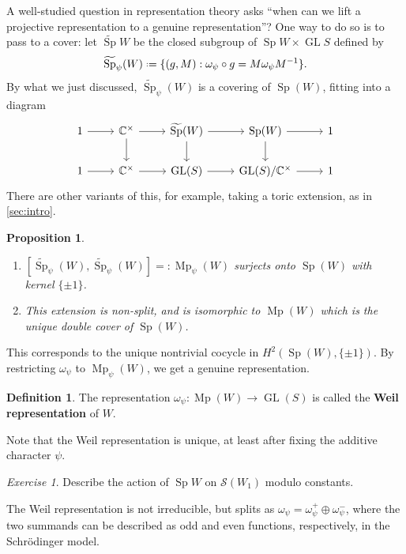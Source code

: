 \documentclass[11pt,a4paper,leqno]{article}
\let\mc\mathcal
\newcommand{\1}{\mathbbm{1}}
\newcommand{\C}{\mathbb{C}}
\newcommand*{\defeq}{\mathrel{\vcenter{\baselineskip0.5ex \lineskiplimit0pt
      \hbox{\scriptsize.}\hbox{\scriptsize.}}}%
  =}
\DeclareMathOperator{\Sp}{Sp}
\DeclareMathOperator{\Mp}{Mp}
\newcommand{\SpC}{\widetilde{\operatorname{\Sp}}}
\DeclareMathOperator{\GL}{GL}
\theoremstyle{plain}
\newtheorem{prop}[theorem]{Proposition}
\theoremstyle{definition}
\newtheorem{definition}[theorem]{Definition}
\theoremstyle{remark}
\newtheorem*{exercise}{Exercise}
\numberwithin{equation}{section}
\begin{document}
A well-studied question in representation theory asks ``when can we
lift a projective representation to a genuine representation''? One
way to do so is to pass to a cover: let $\SpC W $ be the closed
subgroup of $\Sp W \times \GL S $ defined by
\begin{equation}
  \label{eq:16}
\SpC_{\psi}(W) \defeq \{(g,M) : \omega_{\psi}\circ g = M \omega_{\psi} M^{-1}\}.
\end{equation}
By what we just discussed, $\SpC_{\psi} (W)$ is a covering of $\Sp(W)$,
fitting into a diagram
\begin{equation}
  \label{eq:18}
\begin{tikzcd}
1 \arrow[r] & \C^\times \arrow[d] \arrow[r] & \SpC (W) \arrow[d] \arrow[r] & \Sp(W) \arrow[d] \arrow[r]  & 1 \\
1 \arrow[r] & \C^\times \arrow[r]           & \GL(S) \arrow[r]           & \GL(S)/\C^\times \arrow[r] & 1
\end{tikzcd}
\end{equation}
There are other variants of this, for example, taking a toric
extension, as in \cref{sec:intro}.

\begin{prop}
  \begin{enumerate}
  \item $[\SpC_{\psi}(W), \SpC_{\psi}(W)] =: \Mp_{\psi} (W)$ surjects onto
    $\Sp(W)$ with kernel $\{\pm 1\}$.
\item This extension is non-split, and is isomorphic to $\Mp(W)$ which
  is the unique double cover of $\Sp(W)$. 
  \end{enumerate}
\end{prop}
This corresponds to the unique nontrivial cocycle in
$H^{2}(\Sp(W),\{\pm 1\})$. By restricting $\omega_{\psi}$ to $\Mp_{\psi}(W)$, we
get a genuine representation.
\begin{definition}
  The representation $\omega_{\psi} \colon \Mp(W) \to \GL(S)$ is called the
  \textbf{Weil representation} of $W$.
\end{definition}
Note that the Weil representation is unique, at least after fixing the
additive character $\psi$.
\begin{exercise}
Describe the action of $\Sp W$ on $\mc S (W_{1})$ modulo constants.
\end{exercise}
The Weil representation is not irreducible, but splits as $\omega_{\psi} =
\omega_{\psi}^{+} \oplus \omega_{\psi}^{-}$, where the two summands can be described as odd
and even functions, respectively, in the Schrödinger model.
\end{document}
